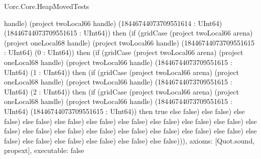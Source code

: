 \begin{lexlean}{Uorc.Core.HeapMovedTests}
\begin{semanticmodule}
{handle) (project twoLocal66 handle) (18446744073709551614 : UInt64) (18446744073709551615 : UInt64)) then (if (gridCase (project twoLocal66 arena) (project oneLocal68 handle) (project twoLocal66 handle) (18446744073709551615 : UInt64) (0 : UInt64)) then (if (gridCase (project twoLocal66 arena) (project oneLocal68 handle) (project twoLocal66 handle) (18446744073709551615 : UInt64) (1 : UInt64)) then (if (gridCase (project twoLocal66 arena) (project oneLocal68 handle) (project twoLocal66 handle) (18446744073709551615 : UInt64) (2 : UInt64)) then (if (gridCase (project twoLocal66 arena) (project oneLocal68 handle) (project twoLocal66 handle) (18446744073709551615 : UInt64) (18446744073709551615 : UInt64)) then true else false) else false) else false) else false) else false) else false) else false) else false) else false) else false) else false) else false) else false) else false) else false) else false) else false) else false) else false) else false) else false) else false) else false) else false))),
  axioms: [Quot.sound, propext],
  executable: false
}


\end{semanticmodule}
\end{lexlean}
